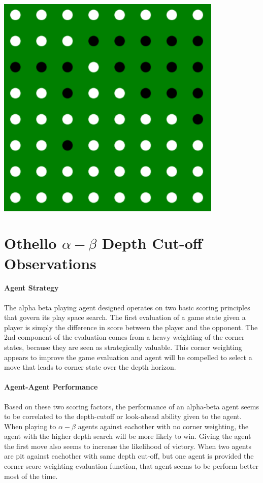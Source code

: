 \documentclass[12pt]{article}
\begin{document}
\maketitle\
\begin{center}
\includegraphics[scale=.8]{end_board}
\end{center}
\section{Othello $\alpha - \beta$ Depth Cut-off Observations}
\paragraph{Agent Strategy}The alpha beta playing agent designed operates on two basic scoring principles that govern its play space search. The first evaluation of a game state given a player is simply the difference in score between the player and the opponent. The 2nd component of the evaluation comes from a heavy weighting of the corner states, because they are seen as strategically valuable. This corner weighting appears to improve the game evaluation and agent will be compelled to select a move that leads to corner state over the depth horizon. 

\paragraph{Agent-Agent Performance} Based on these two scoring factors, the performance of an alpha-beta agent seems to be correlated to the depth-cutoff or look-ahead ability given to the agent. When playing to $\alpha-\beta$ agents against eachother with no corner weighting, the agent with the higher depth search will be more likely to win. Giving the agent the first move also seems to increase the likelihood of victory. When two agents are pit against eachother with same depth cut-off, but one agent is provided the corner score weighting evaluation function, that agent seems to be perform better most of the time. 
\end{document}
